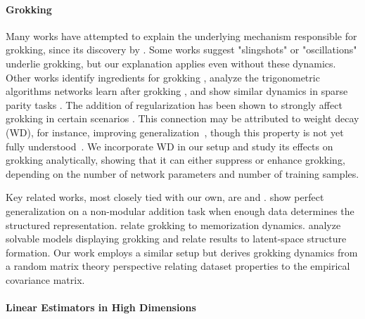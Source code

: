 \documentclass[a4paper,11pt]{article}
\begin{document}
\paragraph{Grokking}  
Many works have attempted to explain the underlying mechanism responsible for grokking, since its discovery by \cite{power2022grokking}. Some works suggest "slingshots" \cite{thilak2022slingshot} or "oscillations" \cite{notsawo2023predicting} underlie grokking, but our explanation applies even without these dynamics.
Other works identify ingredients for grokking \cite{davies2023unifying, nanda2023progress}, analyze the trigonometric algorithms networks learn after grokking \cite{nanda2023progress, chughtai2023toy, merrill2023tale}, and show similar dynamics in sparse parity tasks \cite{merrill2023tale}. 
%
The addition of regularization has been shown to strongly affect grokking in certain scenarios \cite{power2022grokking,liu2023omnigrok}. This connection may be attributed to weight decay (WD), for instance, improving generalization~\cite{Krogh1991ASW}, though this property is not yet fully understood~\cite{zhangWang}. We incorporate WD in our setup and study its effects on grokking analytically, showing that it can either suppress or enhance grokking, depending on the number of network parameters and number of training samples. 

Key related works, most closely tied with our own, are \cite{liu2022towards, liu2023omnigrok} and \cite{zunko2022grokking}. \cite{liu2022towards} show perfect generalization on a non-modular addition task when enough data determines the structured representation. \cite{liu2023omnigrok} relate grokking to memorization dynamics. \cite{zunko2022grokking} analyze solvable models displaying grokking and relate results to latent-space structure formation. Our work employs a similar setup but derives grokking dynamics from a random matrix theory perspective relating dataset properties to the empirical covariance matrix.

\paragraph{Linear Estimators in High Dimensions}  
\end{document}
